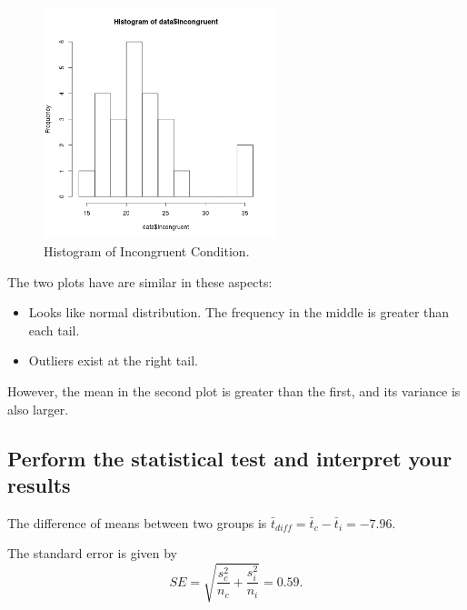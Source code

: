 \documentclass[paper=a4, fontsize=11pt]{scrartcl} %
\numberwithin{equation}{section} %
\numberwithin{figure}{section} %
\numberwithin{table}{section} %
\begin{document}
\begin{figure}[h!]
    \centering
    \includegraphics[width=0.6\textwidth]{hist_incongruent.png}
    \caption{Histogram of Incongruent Condition.}
    \label{fig:hist-incongruent}
\end{figure}

The two plots have are similar in these aspects:
\begin{itemize}
    \item Looks like normal distribution. The frequency in the middle
        is greater than each tail.
    \item Outliers exist at the right tail.
\end{itemize}

However, the mean in the second plot is greater than the first, and
its variance is also larger.

\subsection{Perform the statistical test and interpret your results}
\medskip
\noindent{}
\medskip

The difference of means between two groups
is $\bar{t}_{diff} = \bar{t}_c-\bar{t}_i = -7.96$.

The standard error is given by
\begin{equation}
    SE = \sqrt{\frac{s_c^2}{n_c} + \frac{s_i^2}{n_i}} = 0.59.
\end{equation}
\end{document}
